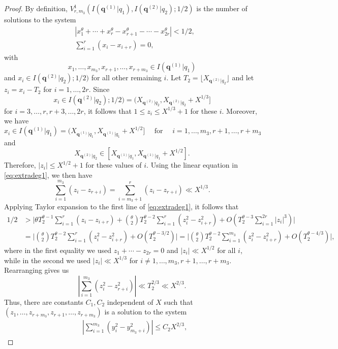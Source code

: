 \documentclass[11pt,reqno]{amsart}
\numberwithin{equation}{section}
\begin{document}
\begin{proof}
By definition, $V_{r,m_3}^1(I(\mathbf{q}^{(1)}|q_1), I(\mathbf{q}^{(2)}|q_2);1/2)$ is the number of solutions to the system 
\begin{equation} \label{eq:extradeg1}
\begin{aligned}
& |x_1^{\theta}+\cdots+x_r^{\theta}-x_{r+1}^{\theta}-\cdots-x_{2r}^{\theta}| < 1/2, 
\\ 
& \sum_{i=1}^r (x_i-x_{i+r}) = 0, 
\end{aligned}
\end{equation}
with 
\[x_1,\ldots,x_{m_3}, x_{r+1}, \ldots,x_{r+m_3} \in I(\mathbf{q}^{(1)}|q_1)\] 
and $x_i \in I(\mathbf{q}^{(2)}|q_2);1/2)$ for all other remaining $i$. Let $T_2 = \lfloor X_{\mathbf{q}^{(2)}|q_2} \rfloor$ 
and let $z_i = x_i-T_2$ for $i = 1, \ldots, 2r$. Since 
\[x_i \in I(\mathbf{q}^{(2)}|q_2);1/2) = (X_{\mathbf{q}^{(2)}|q_2}, X_{\mathbf{q}^{(2)}|q_2}+X^{1/3}]\]
for $i = 3,\ldots,r,r+3,\ldots,2r$, it follows that $1 \leq z_i \leq X^{1/3}+1$ for these $i$. Moreover, we have 
\[x_i \in I(\mathbf{q}^{(1)}|q_1) = (X_{\mathbf{q}^{(1)}|q_1}, X_{\mathbf{q}^{(1)}|q_1}+X^{1/2}] \quad \text{ for } \quad i = 1,\ldots,m_3,r+1, \ldots, r+m_3 \] 
and 
\[X_{\mathbf{q}^{(2)}|q_2} \in [X_{\mathbf{q}^{(1)}|q_1}, X_{\mathbf{q}^{(1)}|q_1}+X^{1/2}]. \] 
Therefore, $|z_i| \leq X^{1/2}+1$ for these values of $i$. Using the linear equation in \eqref{eq:extradeg1}, we then have 
\[ \sum_{i=1}^{m_3} (z_i-z_{r+i}) = \sum_{i=m_3+1}^r (z_i-z_{r+i}) \ll X^{1/3}. \]
Applying Taylor expansion to the first line of \eqref{eq:extradeg1}, it follows that 
\begin{align*} 
1/2 &  > \Big| \theta T_2^{\theta-1}\sum_{i=1}^r (z_i-z_{i+r})+\binom{\theta}{2} T_2^{\theta-2} \sum_{i=1}^r(z_i^2-z_{i+r}^2) +O(T_2^{\theta-3} \sum_{i=1}^{2r} |z_i|^3) \Big| 
\\ 
& = \Big| \binom{\theta}{2} T_2^{\theta-2} \sum_{i=1}^r(z_i^2-z_{i+r}^2) +O(T_2^{\theta-3/2}) \Big| 
= \Big| \binom{\theta}{2} T_2^{\theta-2} \sum_{i=1}^{m_3} (z_i^2-z_{i+r}^2) +O(T_2^{\theta-4/3}) \Big|, 
\end{align*}
where in the first equality we used $z_1+\cdots-z_{2r} = 0$ and $|z_i| \ll X^{1/2}$ for all $i$, while in the second we used $|z_i| \ll X^{1/3}$ for $i \neq 1,\ldots,m_3,r+1, \ldots,r+m_3$. Rearranging gives us 
\[ |\sum_{i=1}^{m_3} (z_i^2-z_{r+i}^2)| \ll T_2^{2/3} \ll X^{2/3}. \]
Thus, there are constants $C_1, C_2$ independent of $X$ such that $(z_1,\ldots,z_{r+m_3},z_{r+1},\ldots, z_{r+m_3})$ is a solution to the system 
\begin{align*}
& |\sum_{i=1}^{m_3} (y_i^2-y_{m_3+i}^2)| \leq C_2X^{2/3}, 

\end{align*}
\end{proof}
\end{document}
